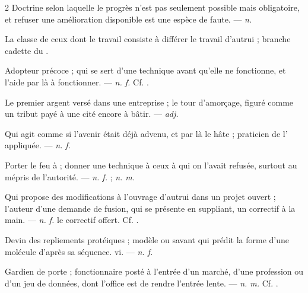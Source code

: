 \begin{multicols}{2}
 Doctrine selon laquelle le progrès n'est pas seulement possible mais obligatoire, et refuser une amélioration disponible est une espèce de faute. —  \textit{n.}

 La classe de ceux dont le travail consiste à différer le travail d'autrui ; branche cadette du .

 Adopteur précoce ; qui se sert d'une technique avant qu'elle ne fonctionne, et l'aide par là à fonctionner. —  \textit{n. f.} Cf. .

 Le premier argent versé dans une entreprise ; le tour d'amorçage, figuré comme un tribut payé à une cité encore à bâtir.   —  \textit{adj.}

 Qui agit comme si l'avenir était déjà advenu, et par là le hâte ; praticien de l' appliquée. —  \textit{n. f.}

 Porter le feu à ; donner une technique à ceux à qui on l'avait refusée, surtout au mépris de l'autorité. —  \textit{n. f.} ;  \textit{n. m.}

 Qui propose des modifications à l'ouvrage d'autrui dans un projet ouvert ; l'auteur d'une demande de fusion, qui se présente en suppliant, un correctif à la main. —  \textit{n. f.} le correctif offert. Cf. .

 Devin des repliements protéiques ; modèle ou savant qui prédit la forme d'une molécule d'après sa séquence.   vi. —  \textit{n. f.}

 Gardien de porte ; fonctionnaire posté à l'entrée d'un marché, d'une profession ou d'un jeu de données, dont l'office est de rendre l'entrée lente. —  \textit{n. m.} Cf. .


\end{multicols}
